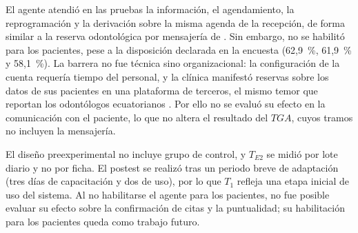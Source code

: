 El agente atendió en las pruebas la información, el agendamiento, la reprogramación y la derivación sobre la misma agenda de la recepción, de forma similar a la reserva odontológica por mensajería de \cite{hmadchayyapum2025line}. Sin embargo, no se habilitó para los pacientes, pese a la disposición declarada en la encuesta (62,9~\%, 61,9~\% y 58,1~\%). La barrera no fue técnica sino organizacional: la configuración de la cuenta requería tiempo del personal, y la clínica manifestó reservas sobre los datos de sus pacientes en una plataforma de terceros, el mismo temor que reportan los odontólogos ecuatorianos \cite{cherrezojeda2020ict}. Por ello no se evaluó su efecto en la comunicación con el paciente, lo que no altera el resultado del $TGA$, cuyos tramos no incluyen la mensajería.

El diseño preexperimental no incluye grupo de control, y $T_{E2}$ se midió por lote diario y no por ficha. El postest se realizó tras un periodo breve de adaptación (tres días de capacitación y dos de uso), por lo que $T_1$ refleja una etapa inicial de uso del sistema. Al no habilitarse el agente para los pacientes, no fue posible evaluar su efecto sobre la confirmación de citas y la puntualidad; su habilitación para los pacientes queda como trabajo futuro.
